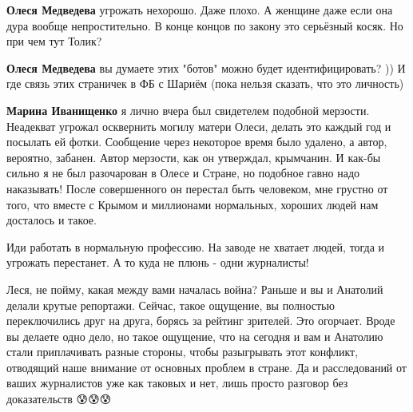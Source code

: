 \begin{itemize}
\textbf{Олеся Медведева} угрожать нехорошо. Даже плохо. А женщине даже если она дура вообще непростительно. В конце концов по закону это серьёзный косяк. Но при чем тут Толик?

 
\textbf{Олеся Медведева} вы думаете этих "ботов" можно будет идентифицировать? )) И где связь этих страничек в ФБ с Шариём (пока нельзя сказать, что это личность)

 
\textbf{Марина Иванищенко} 
я лично вчера был свидетелем подобной мерзости. Неадекват угрожал осквернить
могилу матери Олеси, делать это каждый год и посылать ей фотки. Сообщение через
некоторое время было удалено, а автор, вероятно, забанен. Автор мерзости, как
он утверждал, крымчанин. И как-бы сильно я не был разочарован в Олесе и Стране,
но подобное гавно надо наказывать! После совершенного он перестал быть
человеком, мне грустно от того, что вместе с Крымом и миллионами нормальных,
хороших людей нам досталось и такое.

 
Иди работать в нормальную профессию. На заводе не хватает людей, тогда и
угрожать перестанет. А то куда не плюнь - одни журналисты!


 

Леся, не пойму, какая между вами началась война? Раньше и вы и Анатолий делали
крутые репортажи. Сейчас, такое ощущение, вы полностью переключились друг на
друга, борясь за рейтинг зрителей. Это огорчает. Вроде вы делаете одно дело, но
такое ощущение, что на сегодня и вам и Анатолию стали приплачивать разные
стороны, чтобы разыгрывать этот конфликт, отводящий наше внимание от основных
проблем в стране. Да и расследований от ваших журналистов уже как таковых и
нет, лишь просто разговор без доказательств 😰😰😰



\end{itemize}
